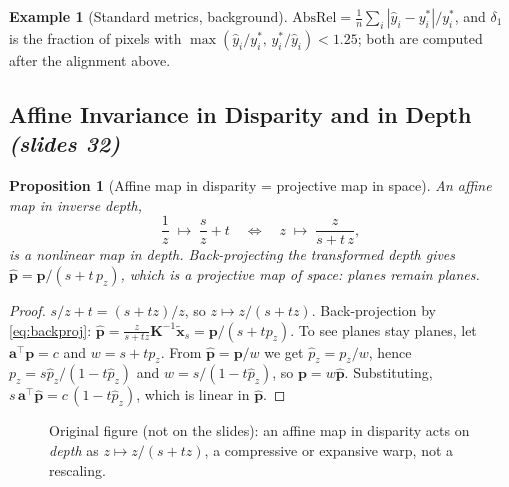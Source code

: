 \documentclass[11pt,a4paper]{article}
\numberwithin{equation}{section}
\newcommand{\slides}[1]{\texorpdfstring{\;\emph{(slides #1)}}{ (slides #1)}}
\newcommand{\xt}{\tilde{\mathbf{x}}}
\newcommand{\Kinv}{\bm K^{-1}}
\theoremstyle{plain}
\newtheorem{proposition}[theorem]{Proposition}
\theoremstyle{definition}
\newtheorem{example}[theorem]{Example}
\begin{document}
\begin{example}[Standard metrics, background]
$\mathrm{AbsRel}=\frac1n\sum_i|\hat y_i-y^\ast_i|/y^\ast_i$, and $\delta_1$ is the fraction of pixels with $\max(\hat y_i/y^\ast_i,\,y^\ast_i/\hat y_i)<1.25$; both are computed after the alignment above.
\end{example}
 
\subsection{Affine Invariance in Disparity and in Depth \slides{32}}
 
\begin{proposition}[Affine map in disparity = projective map in space]\label{prop:affdisp}
An affine map in inverse depth,
\[
\frac1z\;\longmapsto\;\frac{s}{z}+t\quad\Longleftrightarrow\quad z\;\longmapsto\;\frac{z}{s+t\,z},
\]
is a nonlinear map in depth. Back-projecting the transformed depth gives $\hat{\bm p}=\bm p/(s+t\,p_z)$, which is a \emph{projective} map of space: planes remain planes.
\end{proposition}
\begin{proof}
$s/z+t=(s+tz)/z$, so $z\mapsto z/(s+tz)$. Back-projection by \eqref{eq:backproj}: $\hat{\bm p}=\frac{z}{s+tz}\Kinv\xt_s=\bm p/(s+tp_z)$. To see planes stay planes, let $\bm a^\top\bm p=c$ and $w=s+tp_z$. From $\hat{\bm p}=\bm p/w$ we get $\hat p_z=p_z/w$, hence $p_z=s\hat p_z/(1-t\hat p_z)$ and $w=s/(1-t\hat p_z)$, so $\bm p=w\hat{\bm p}$. Substituting, $s\,\bm a^\top\hat{\bm p}=c\,(1-t\hat p_z)$, which is linear in $\hat{\bm p}$. \qedhere
\end{proof}
 
\begin{figure}[htbp]
\centering
{}
\caption{Original figure (not on the slides): an affine map in disparity acts on \emph{depth} as $z\mapsto z/(s+tz)$, a compressive or expansive warp, not a rescaling.}
\end{figure}
 
\end{document}
